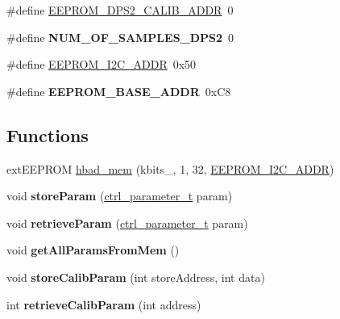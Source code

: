 \begin{DoxyCompactItemize}
\item 
\#define \hyperlink{group___memory_module_ga457a65a7facf762392911533c56863ee}{E\+E\+P\+R\+O\+M\+\_\+\+D\+P\+S2\+\_\+\+C\+A\+L\+I\+B\+\_\+\+A\+D\+DR}~0
\item 
\mbox{\label{group___memory_module_ga477683d5545b60e414085d4433ffa1f3}} 
\#define {\bfseries N\+U\+M\+\_\+\+O\+F\+\_\+\+S\+A\+M\+P\+L\+E\+S\+\_\+\+D\+P\+S2}~0
\item 
\#define \hyperlink{group___memory_module_ga0bb5af400d8883a7a9dc432ad3296546}{E\+E\+P\+R\+O\+M\+\_\+\+I2\+C\+\_\+\+A\+D\+DR}~0x50
\item 
\mbox{\label{group___memory_module_ga56dfa6b0d81361c72a7e29127228eead}} 
\#define {\bfseries E\+E\+P\+R\+O\+M\+\_\+\+B\+A\+S\+E\+\_\+\+A\+D\+DR}~0x\+C8
\end{DoxyCompactItemize}
\subsection*{Functions}
\begin{DoxyCompactItemize}
\item 
ext\+E\+E\+P\+R\+OM \hyperlink{group___memory_module_ga0f8bd3acd0e41754fec8a0b799201f10}{hbad\+\_\+mem} (kbits\+\_, 1, 32, \hyperlink{group___memory_module_ga0bb5af400d8883a7a9dc432ad3296546}{E\+E\+P\+R\+O\+M\+\_\+\+I2\+C\+\_\+\+A\+D\+DR})
\item 
\mbox{\label{group___memory_module_gab274c22126224e7366c9303fbf78ec98}} 
void {\bfseries store\+Param} (\hyperlink{structctrl__parameter__t}{ctrl\+\_\+parameter\+\_\+t} param)
\item 
\mbox{\label{group___memory_module_ga149cb7311a6baceb25b3689e928e7f9c}} 
void {\bfseries retrieve\+Param} (\hyperlink{structctrl__parameter__t}{ctrl\+\_\+parameter\+\_\+t} param)
\item 
\mbox{\label{group___memory_module_gaecdc348f967097a8ebb24de230f072a2}} 
void {\bfseries get\+All\+Params\+From\+Mem} ()
\item 
\mbox{\label{group___memory_module_ga603f419c1db04f7cc2505107e624fb06}} 
void {\bfseries store\+Calib\+Param} (int store\+Address, int data)
\item 
\mbox{\label{group___memory_module_gacd5ce5b3ab8bac49d736a8d441b43339}} 
int {\bfseries retrieve\+Calib\+Param} (int address)
\end{DoxyCompactItemize}


